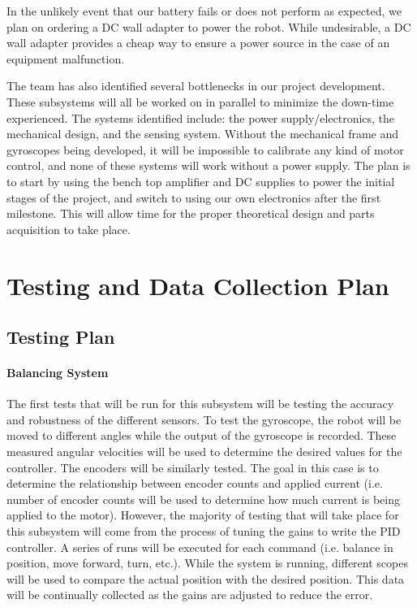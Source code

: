 \documentclass[11pt]{report}
\begin{document}
\begin{spacing}{1.5}
In the unlikely event that our battery fails or does not perform as expected, we plan on ordering a DC wall adapter to power the robot. While undesirable, a DC wall adapter provides a cheap way to ensure a power source in the case of an equipment malfunction. 

The team has also identified several bottlenecks in our project development. These subsystems will all be worked on in parallel to minimize the down-time experienced. The systems identified include: the power supply/electronics, the mechanical design, and the sensing system. Without the mechanical frame and gyroscopes being developed, it will be impossible to calibrate any kind of motor control, and none of these systems will work without a power supply. The plan is to start by using the bench top amplifier and DC supplies to power the initial stages of the project, and switch to using our own electronics after the first milestone. This will allow time for the proper theoretical design and parts acquisition to take place.  


\section*{Testing and Data Collection Plan} %

\subsection*{Testing Plan}

\paragraph*{Balancing System}
The first tests that will be run for this subsystem will be testing the accuracy and robustness of the different sensors.  To test the gyroscope, the robot will be moved to different angles while the output of the gyroscope is recorded.  These measured angular velocities will be used to determine the desired values for the controller.  The encoders will be similarly tested.  The goal in this case is to determine the relationship between encoder counts and applied current (i.e. number of encoder counts will be used to determine how much current is being applied to the motor).    However, the majority of testing that will take place for this subsystem will come from the process of tuning the gains to write the PID controller.  A series of runs will be executed for each command (i.e. balance in position, move forward, turn, etc.).  While the system is running, different scopes will be used to compare the actual position with the desired position.  This data will be continually collected as the gains are adjusted to reduce the error.  


\end{spacing}
\end{document}
